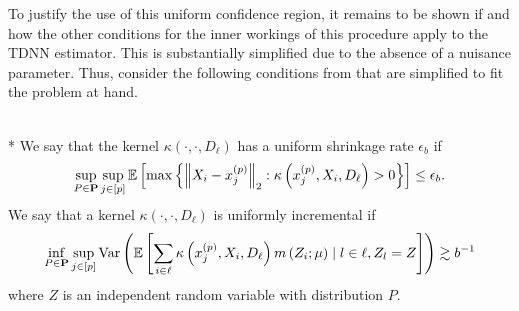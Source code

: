 To justify the use of this uniform confidence region, it remains to be shown if and how the other conditions for the inner workings of this procedure apply to the TDNN estimator.
This is substantially simplified due to the absence of a nuisance parameter.
Thus, consider the following conditions from \cite{ritzwoller_uniform_2024} that are simplified to fit the problem at hand.

\begin{boxD}
	\begin{dfn}\mbox{}\\*
		We say that the kernel $\kappa\left(\cdot, \cdot, D_{\ell}\right)$ has a uniform shrinkage rate $\epsilon_b$ if
		\begin{equation}
			\sup_{P \in \mathbf{P}} \sup_{j \in[p]}
			\mathbb{E}\left[\max \left\{\left\|X_{i}-x^{(p)}_{j}\right\|_{2}: \kappa\left(x^{(p)}_{j}, X_{i}, D_{\ell}\right)>0\right\}\right]
			\leq \epsilon_b .
		\end{equation}
		We say that a kernel $\kappa\left(\cdot, \cdot, D_{\ell}\right)$ is uniformly incremental if
		\begin{equation}
			\inf_{P \in \mathbf{P}} \sup_{j \in[p]}
			\text{Var}\left(\mathbb{E}\left[\sum_{i \in \ell} \kappa\left(x^{(p)}_{j}, X_{i}, D_{\ell}\right) m\left(Z_{i} ; \mu\right) \mid l \in \ell, Z_l = Z\right]\right)
			\gtrsim b^{-1}
		\end{equation}
		where $Z$ is an independent random variable with distribution $P$.
	\end{dfn}
\end{boxD}

